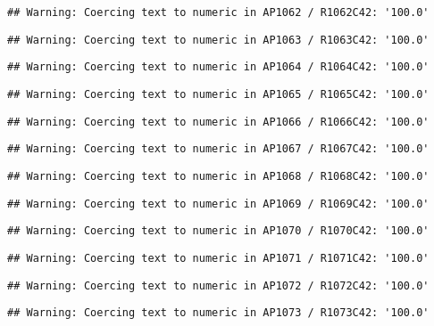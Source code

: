 \documentclass[
]{article}
\begin{document}
\begin{verbatim}
## Warning: Coercing text to numeric in AP1062 / R1062C42: '100.0'
\end{verbatim}

\begin{verbatim}
## Warning: Coercing text to numeric in AP1063 / R1063C42: '100.0'
\end{verbatim}

\begin{verbatim}
## Warning: Coercing text to numeric in AP1064 / R1064C42: '100.0'
\end{verbatim}

\begin{verbatim}
## Warning: Coercing text to numeric in AP1065 / R1065C42: '100.0'
\end{verbatim}

\begin{verbatim}
## Warning: Coercing text to numeric in AP1066 / R1066C42: '100.0'
\end{verbatim}

\begin{verbatim}
## Warning: Coercing text to numeric in AP1067 / R1067C42: '100.0'
\end{verbatim}

\begin{verbatim}
## Warning: Coercing text to numeric in AP1068 / R1068C42: '100.0'
\end{verbatim}

\begin{verbatim}
## Warning: Coercing text to numeric in AP1069 / R1069C42: '100.0'
\end{verbatim}

\begin{verbatim}
## Warning: Coercing text to numeric in AP1070 / R1070C42: '100.0'
\end{verbatim}

\begin{verbatim}
## Warning: Coercing text to numeric in AP1071 / R1071C42: '100.0'
\end{verbatim}

\begin{verbatim}
## Warning: Coercing text to numeric in AP1072 / R1072C42: '100.0'
\end{verbatim}

\begin{verbatim}
## Warning: Coercing text to numeric in AP1073 / R1073C42: '100.0'
\end{verbatim}
\end{document}

